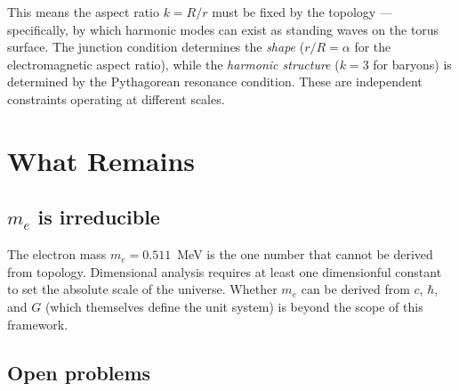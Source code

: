 \documentclass[11pt,a4paper]{article}
\begin{document}
This means the aspect ratio $k = R/r$ must be fixed by the topology --- specifically, by which harmonic modes can exist as standing waves on the torus surface. The junction condition determines the \emph{shape} ($r/R = \alpha$ for the electromagnetic aspect ratio), while the \emph{harmonic structure} ($k = 3$ for baryons) is determined by the Pythagorean resonance condition. These are independent constraints operating at different scales.

\section{What Remains}
\label{sec:open}

\subsection{$m_e$ is irreducible}

The electron mass $m_e = 0.511$~MeV is the one number that cannot be derived from topology. Dimensional analysis requires at least one dimensionful constant to set the absolute scale of the universe. Whether $m_e$ can be derived from $c$, $\hbar$, and $G$ (which themselves define the unit system) is beyond the scope of this framework.

\subsection{Open problems}
\end{document}

